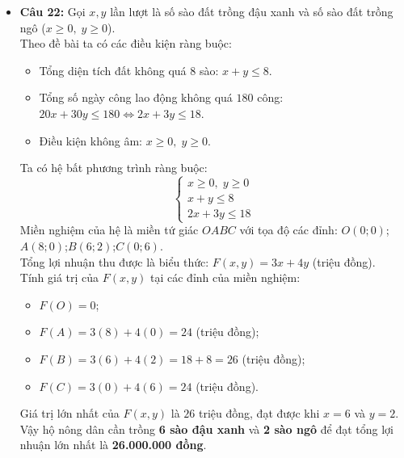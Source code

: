 \documentclass[12pt,a4paper]{article}
\begin{document}
\begin{itemize}[leftmargin=0.6cm, itemsep=2pt, topsep=1pt]
    \item \textbf{Câu 22:}
    Gọi $x, y$ lần lượt là số sào đất trồng đậu xanh và số sào đất trồng ngô ($x \ge 0,\; y \ge 0$).\\
    Theo đề bài ta có các điều kiện ràng buộc:
    \begin{itemize}[itemsep=1pt]
        \item Tổng diện tích đất không quá $8$ sào: $x + y \le 8$.
        \item Tổng số ngày công lao động không quá $180$ công: $20x + 30y \le 180 \iff 2x + 3y \le 18$.
        \item Điều kiện không âm: $x \ge 0,\; y \ge 0$.
    \end{itemize}
    Ta có hệ bất phương trình ràng buộc:
    \[
    \begin{cases} x \ge 0,\; y \ge 0 \\ x + y \le 8 \\ 2x + 3y \le 18 \end{cases}
    \]
    Miền nghiệm của hệ là miền tứ giác $OABC$ với tọa độ các đỉnh:
    $O(0; 0)$;\quad $A(8; 0)$;\quad $B(6; 2)$;\quad $C(0; 6)$.\\
    Tổng lợi nhuận thu được là biểu thức: $F(x, y) = 3x + 4y$ (triệu đồng).\\
    Tính giá trị của $F(x, y)$ tại các đỉnh của miền nghiệm:
    \begin{itemize}[itemsep=1pt]
        \item $F(O) = 0$;
        \item $F(A) = 3(8) + 4(0) = 24$ (triệu đồng);
        \item $F(B) = 3(6) + 4(2) = 18 + 8 = 26$ (triệu đồng);
        \item $F(C) = 3(0) + 4(6) = 24$ (triệu đồng).
    \end{itemize}
    Giá trị lớn nhất của $F(x, y)$ là $26$ triệu đồng, đạt được khi $x = 6$ và $y = 2$.\\
    Vậy hộ nông dân cần trồng \textbf{6 sào đậu xanh} và \textbf{2 sào ngô} để đạt tổng lợi nhuận lớn nhất là \textbf{26.000.000 đồng}.
\end{itemize}
\end{document}
